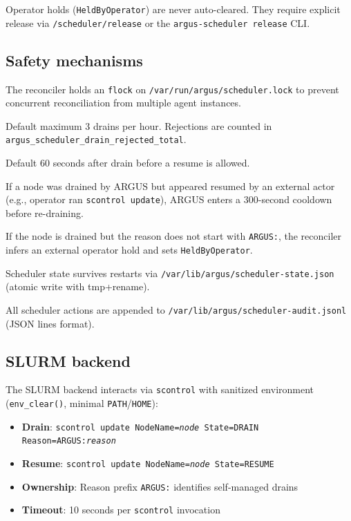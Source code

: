 \documentclass[11pt]{article}
\begin{document}
Operator holds (\texttt{HeldByOperator}) are never auto-cleared. They
require explicit release via \texttt{/scheduler/release} or the
\texttt{argus-scheduler release} CLI.

\subsection{Safety mechanisms}

\begin{description}[style=nextline,leftmargin=0.5cm]
  \item[Advisory lock]
    The reconciler holds an \texttt{flock} on
    \texttt{/var/run/argus/scheduler.lock} to prevent concurrent
    reconciliation from multiple agent instances.
  \item[Drain rate limit]
    Default maximum 3 drains per hour. Rejections are counted in
    \texttt{argus\_scheduler\_drain\_rejected\_total}.
  \item[Resume cooldown]
    Default 60 seconds after drain before a resume is allowed.
  \item[Contested resume detection]
    If a node was drained by ARGUS but appeared resumed by an external actor
    (e.g., operator ran \texttt{scontrol update}), ARGUS enters a 300-second
    cooldown before re-draining.
  \item[External drain detection]
    If the node is drained but the reason does not start with
    \texttt{ARGUS:}, the reconciler infers an external operator hold and
    sets \texttt{HeldByOperator}.
  \item[Persisted state]
    Scheduler state survives restarts via
    \texttt{/var/lib/argus/scheduler-state.json} (atomic write with
    tmp+rename).
  \item[Audit log]
    All scheduler actions are appended to
    \texttt{/var/lib/argus/scheduler-audit.jsonl} (JSON lines format).
\end{description}

\subsection{SLURM backend}

The SLURM backend interacts via \texttt{scontrol} with sanitized
environment (\texttt{env\_clear()}, minimal \texttt{PATH}/\texttt{HOME}):

\begin{itemize}[nosep]
  \item \textbf{Drain}: \texttt{scontrol update NodeName=\textit{node}
        State=DRAIN Reason=ARGUS:\textit{reason}}
  \item \textbf{Resume}: \texttt{scontrol update NodeName=\textit{node}
        State=RESUME}
  \item \textbf{Ownership}: Reason prefix \texttt{ARGUS:} identifies
        self-managed drains
  \item \textbf{Timeout}: 10 seconds per \texttt{scontrol} invocation
\end{itemize}
\end{document}
